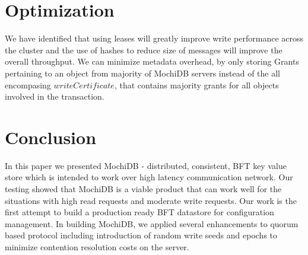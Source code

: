 \documentclass[letterpaper,twocolumn,10pt]{article}
\begin{document}
\section{Optimization}
We have identified that using leases will greatly improve write performance across the cluster and the use of hashes to reduce size of messages will improve the overall throughput. We can minimize metadata overhead, by only storing Grants pertaining to an object from majority of MochiDB servers instead of the all encompasing $writeCertificate$, that contains majority grants for all objects involved in the transaction.

\section{Conclusion}
In this paper we presented MochiDB - distributed, consistent, BFT key value store which is intended to work over high latency communication network. Our testing showed that MochiDB is a viable product that can work well for the situations with high read requests and moderate write requests. Our work is the first attempt to build a production ready BFT datastore for configuration management. In building MochiDB, we applied several enhancements to quorum based protocol including introduction of random write seeds and epochs to minimize contention resolution costs on the server.

{\footnotesize 
}
\end{document}
